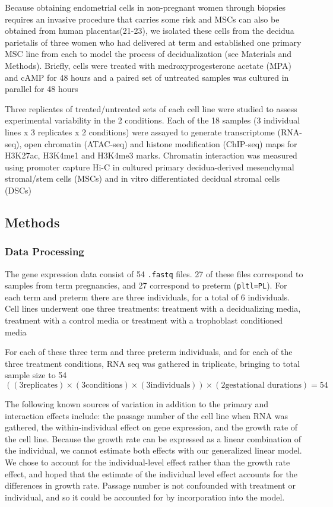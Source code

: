 Because obtaining endometrial cells in non-pregnant women through biopsies requires an invasive procedure that carries some
risk and MSCs can also be obtained from human placentas(21-23), we isolated these cells from the decidua parietalis of
three women who had delivered at term and established one primary MSC line from each to model the process of decidualization
(see Materials and Methods). Briefly, cells were treated with medroxyprogesterone acetate (MPA) and cAMP for 48 hours and a
paired set of untreated samples was cultured in parallel for 48 hours

Three replicates of treated/untreated sets of each cell line were studied to assess experimental variability in the 2 conditions.
Each of the 18 samples (3 individual lines x 3 replicates x 2 conditions) were assayed to generate transcriptome (RNA-seq),
open chromatin (ATAC-seq) and histone modification (ChIP-seq) maps for H3K27ac, H3K4me1 and H3K4me3 marks.  Chromatin interaction
was measured using promoter capture Hi-C in cultured primary decidua-derived mesenchymal stromal/stem cells (MSCs) and in vitro
differentiated decidual stromal cells (DSCs)

\subsection{Methods}\label{sec:org53944c4}


\subsubsection{Data Processing}\label{sec:orgc908098}

The gene expression data consist of 54 \texttt{.fastq} files.  27 of these files correspond to samples from term pregnancies,
and 27 correspond to preterm (\texttt{pltl=PL}).  For each term and preterm there are three individuals, for a total of 6 individuals.
Cell lines underwent one three treatments: treatment with a decidualizing media, treatment with a control media or treatment with a trophoblast conditioned media

For each of these three term and three preterm individuals, and for each of the three treatment conditions, RNA seq was gathered in triplicate, bringing to total sample size to 54 
$$ \left((3 \text{replicates}) \times (3 \text{conditions})  \times (3 \text{individuals})\right) \times (2 \text{gestational durations})=54$$

The following known sources of variation in addition to the primary and interaction effects include: the passage number of the cell line when RNA was gathered, the within-individual effect on gene expression, and
the growth rate of the cell line. Because the growth rate can be expressed as a linear combination of the individual, we cannot estimate both effects with our generalized linear model.  We chose to account for the
individual-level effect rather than the growth rate effect, and hoped that the estimate of the individual level effect accounts for the differences in growth rate. Passage number is not confounded with treatment or
individual, and so it could be accounted for by incorporation into the model.


